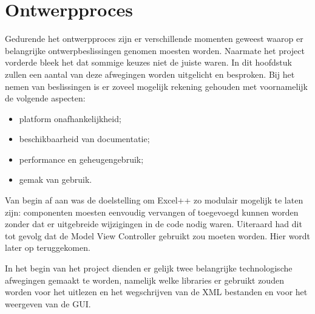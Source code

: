 \documentclass[a4paper,11pt]{article}
\begin{document}
\newpage\section{Ontwerpproces}
Gedurende het ontwerpproces zijn er verschillende momenten geweest waarop er belangrijke ontwerpbeslissingen genomen moesten worden. Naarmate het project vorderde bleek het dat sommige keuzes niet de juiste waren. In dit hoofdstuk zullen een aantal van deze afwegingen worden uitgelicht en besproken. Bij het nemen van beslissingen is er zoveel mogelijk rekening gehouden met voornamelijk de volgende aspecten:
\begin{itemize}
	\item platform onafhankelijkheid;
	\item beschikbaarheid van documentatie;
	\item performance en geheugengebruik;
	\item gemak van gebruik.
\end{itemize}

Van begin af aan was de doelstelling om Excel++ zo modulair mogelijk te laten zijn: componenten moesten eenvoudig vervangen of toegevoegd kunnen worden zonder dat er uitgebreide wijzigingen in de code nodig waren. Uiteraard had dit tot gevolg dat de Model View Controller gebruikt zou moeten worden. Hier wordt later op teruggekomen.

In het begin van het project dienden er gelijk twee belangrijke technologische afwegingen gemaakt te worden, namelijk welke libraries er gebruikt zouden worden voor het uitlezen en het wegschrijven van de XML bestanden en voor het weergeven van de GUI.\\
\end{document}
